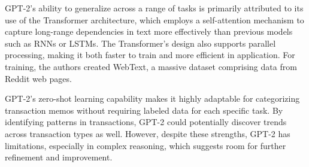 \documentclass[12pt,letterpaper]{article}
\begin{document}
GPT-2’s ability to generalize across a range of tasks is primarily attributed to its use of the Transformer architecture, which employs a self-attention mechanism to capture long-range dependencies in text more effectively than previous models such as RNNs or LSTMs. The Transformer’s design also supports parallel processing, making it both faster to train and more efficient in application. For training, the authors created WebText, a massive dataset comprising data from Reddit web pages.

GPT-2’s zero-shot learning capability makes it highly adaptable for categorizing transaction memos without requiring labeled data for each specific task. By identifying patterns in transactions, GPT-2 could potentially discover trends across transaction types as well. However, despite these strengths, GPT-2 has limitations, especially in complex reasoning, which suggests room for further refinement and improvement.




\end{document}
